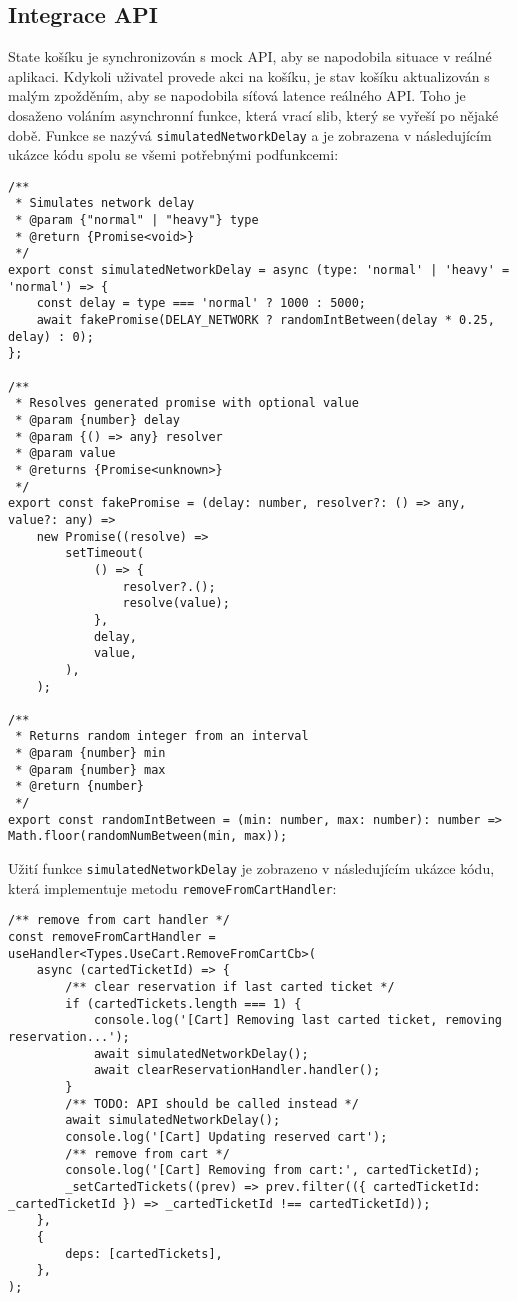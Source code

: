 \subsection{Integrace API}
\label{subsec:implementace-kosik-api}
State košíku je synchronizován s mock API, aby se napodobila situace v reálné aplikaci.
Kdykoli uživatel provede akci na košíku, je stav košíku aktualizován s malým zpožděním, aby se napodobila síťová latence reálného API\@.
Toho je dosaženo voláním asynchronní funkce, která vrací slib, který se vyřeší po nějaké době.
Funkce se nazývá \texttt{simulatedNetworkDelay} a je zobrazena v následujícím ukázce kódu spolu se všemi potřebnými podfunkcemi:

\begin{verbatim}
/**
 * Simulates network delay
 * @param {"normal" | "heavy"} type
 * @return {Promise<void>}
 */
export const simulatedNetworkDelay = async (type: 'normal' | 'heavy' = 'normal') => {
	const delay = type === 'normal' ? 1000 : 5000;
	await fakePromise(DELAY_NETWORK ? randomIntBetween(delay * 0.25, delay) : 0);
};

/**
 * Resolves generated promise with optional value
 * @param {number} delay
 * @param {() => any} resolver
 * @param value
 * @returns {Promise<unknown>}
 */
export const fakePromise = (delay: number, resolver?: () => any, value?: any) =>
	new Promise((resolve) =>
		setTimeout(
			() => {
				resolver?.();
				resolve(value);
			},
			delay,
			value,
		),
	);

/**
 * Returns random integer from an interval
 * @param {number} min
 * @param {number} max
 * @return {number}
 */
export const randomIntBetween = (min: number, max: number): number => Math.floor(randomNumBetween(min, max));
\end{verbatim}

Užití funkce \texttt{simulatedNetworkDelay} je zobrazeno v následujícím ukázce kódu, která implementuje metodu \texttt{removeFromCartHandler}:

\begin{verbatim}
/** remove from cart handler */
const removeFromCartHandler = useHandler<Types.UseCart.RemoveFromCartCb>(
	async (cartedTicketId) => {
		/** clear reservation if last carted ticket */
		if (cartedTickets.length === 1) {
			console.log('[Cart] Removing last carted ticket, removing reservation...');
			await simulatedNetworkDelay();
			await clearReservationHandler.handler();
		}
		/** TODO: API should be called instead */
		await simulatedNetworkDelay();
		console.log('[Cart] Updating reserved cart');
		/** remove from cart */
		console.log('[Cart] Removing from cart:', cartedTicketId);
		_setCartedTickets((prev) => prev.filter(({ cartedTicketId: _cartedTicketId }) => _cartedTicketId !== cartedTicketId));
	},
	{
		deps: [cartedTickets],
	},
);
\end{verbatim}

